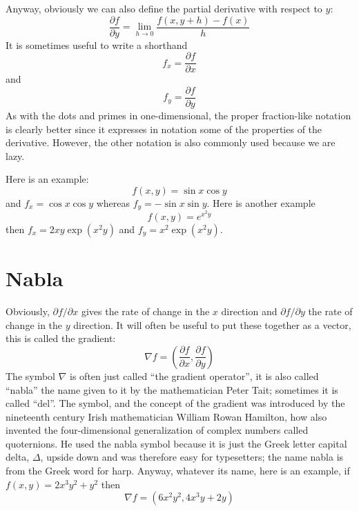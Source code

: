 \documentclass[12pt]{article}
\begin{document}
Anyway, obviously we can also define the partial derivative with respect to $y$:
\begin{equation}
  \frac{\partial f}{\partial y}=\lim_{h\rightarrow 0}\frac{f(x,y+h)-f(x)}{h}
\end{equation}
It is sometimes useful to write a shorthand
\begin{equation}
  f_x=\frac{\partial f}{\partial x}
\end{equation}
and
\begin{equation}
  f_y=\frac{\partial f}{\partial y}
\end{equation}
As with the dots and primes in one-dimensional, the proper
fraction-like notation is clearly better since it expresses in
notation some of the properties of the derivative. However, the other
notation is also commonly used because we are lazy.

Here is an example:
\begin{equation}
  f(x,y)=\sin{x}\cos{y}
\end{equation}
and $f_x=\cos{x}\cos{y}$ whereas $f_y=-\sin{x}\sin{y}$. Here is another example 
\begin{equation}
  f(x,y)=e^{x^2y}
\end{equation}
then $f_x=2xy\exp{(x^2y)}$ and $f_y=x^2\exp{(x^2y)}$.

\section*{Nabla}

Obviously, $\partial f/\partial x$ gives the rate of change in the $x$
direction and $\partial f/\partial y$ the rate of change in the $y$
direction. It will often be useful to put these together as a vector, this is called the gradient:
\begin{equation}
  \nabla f=\left(\frac{\partial f}{\partial x},\frac{\partial f}{\partial y}\right)
\end{equation}
The symbol $\nabla$ is often just called ``the gradient operator'', it
is also called ``nabla'' the name given to it by the mathematician
Peter Tait; sometimes it is called ``del''. The symbol, and the
concept of the gradient was introduced by the nineteenth century Irish
mathematician William Rowan Hamilton, how also invented the
four-dimensional generalization of complex numbers called
quoternions. He used the nabla symbol because it is just the Greek
letter capital delta, $\Delta$, upside down and was therefore easy for
typesetters; the name nabla is from the Greek word for harp. Anyway,
whatever its name, here is an example, if $f(x,y)=2x^3y^2+y^2$ then
\begin{equation}
  \nabla f=(6x^2y^2,4x^3y+2y)
\end{equation}
\end{document}
